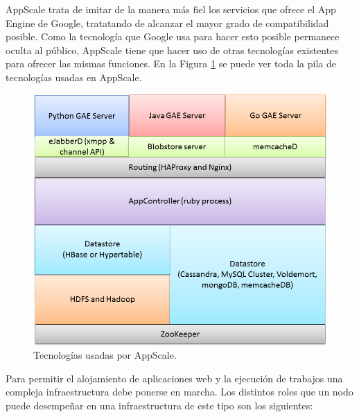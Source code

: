 AppScale trata de imitar de la manera más fiel los servicios que ofrece el App Engine de Google, tratatando de alcanzar el mayor grado de compatibilidad posible. Como la tecnología que Google usa para hacer esto posible permanece oculta al público, AppScale tiene que hacer uso de otras tecnologías existentes para ofrecer las mismas funciones. En la Figura \ref{figure:tecnologias-appscale} se puede ver toda la pila de tecnologías usadas en AppScale.

\begin{figure} [!htbp]
  \centering
  \includegraphics[width=13.5cm]{imagenes/AppScale_Stack.png}
  \caption{Tecnologías usadas por AppScale.}
\label{figure:tecnologias-appscale}
\end{figure}

Para permitir el alojamiento de aplicaciones web y la ejecución de trabajos una compleja infraestructura debe ponerse en marcha. Los distintos roles que un nodo puede desempeñar en una infraestructura de este tipo son los siguientes:

